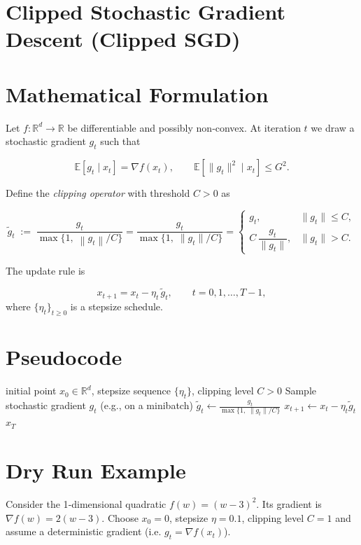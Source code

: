 \documentclass{article}
\newcommand{\E}{\mathbb{E}}
\newcommand{\R}{\mathbb{R}}
\newcommand{\norm}[1]{\left\|#1\right\|}
\newcommand{\clip}[2]{\frac{#1}{\max\{1,\; \norm{#1}/#2\}}}
\begin{document}
\section*{Clipped Stochastic Gradient Descent (Clipped SGD)}

\section*{Mathematical Formulation}
Let $f:\R^{d}\rightarrow\R$ be differentiable and possibly non‑convex.  
At iteration $t$ we draw a stochastic gradient $g_{t}$ such that  

\[
\E\!\left[g_{t}\mid x_{t}\right]=\nabla f(x_{t}),\qquad 
\E\!\left[\|g_{t}\|^{2}\mid x_{t}\right]\le G^{2}. 
\]

Define the \emph{clipping operator} with threshold $C>0$ as  

\[
\tilde g_{t}\;:=\;\clip{g_{t}}{C}
      =\frac{g_{t}}{\max\!\bigl\{1,\; \|g_{t}\|/C\bigr\}}
      =\begin{cases}
          g_{t}, & \|g_{t}\|\le C,\\[4pt]
          C\,\dfrac{g_{t}}{\|g_{t}\|}, & \|g_{t}\|>C .
        \end{cases}
\tag{1}
\]

The update rule is  

\[
x_{t+1}=x_{t}-\eta_{t}\,\tilde g_{t},\qquad t=0,1,\dots ,T-1,
\tag{2}
\]
where $\{\eta_{t}\}_{t\ge0}$ is a stepsize schedule.

\section*{Pseudocode}
\begin{algorithm}[H]
\caption{Clipped SGD}
\begin{algorithmic}[1]
\REQUIRE initial point $x_{0}\in\R^{d}$, stepsize sequence $\{\eta_{t}\}$, clipping level $C>0$
    \STATE Sample stochastic gradient $g_{t}$ (e.g., on a minibatch)
    \STATE $\displaystyle \tilde g_{t}\gets \frac{g_{t}}{\max\{1,\;\|g_{t}\|/C\}}$
    \STATE $x_{t+1}\gets x_{t}-\eta_{t}\tilde g_{t}$
\ENDFOR
\RETURN $x_{T}$
\end{algorithmic}
\end{algorithm}

\section*{Dry Run Example}
Consider the 1‑dimensional quadratic $f(w)=(w-3)^{2}$.  
Its gradient is $\nabla f(w)=2(w-3)$.  
Choose $x_{0}=0$, stepsize $\eta=0.1$, clipping level $C=1$ and assume a deterministic gradient (i.e. $g_{t}=\nabla f(x_{t})$).
\end{document}
